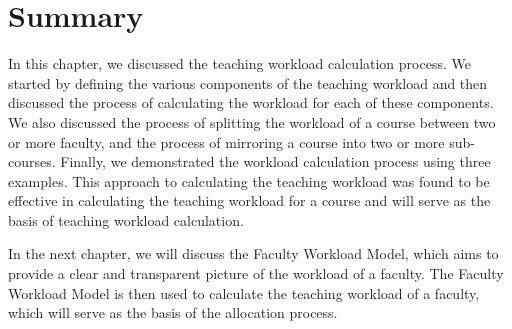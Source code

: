 \section{Summary}

In this chapter, we discussed the teaching workload calculation process. We started by defining the various components of the teaching workload and then discussed the process of calculating the workload for each of these components. We also discussed the process of splitting the workload of a course between two or more faculty, and the process of mirroring a course into two or more sub-courses. Finally, we demonstrated the workload calculation process using three examples. This approach to calculating the teaching workload was found to be effective in calculating the teaching workload for a course and will serve as the basis of teaching workload calculation.

In the next chapter, we will discuss the Faculty Workload Model, which aims to provide a clear and transparent picture of the workload of a faculty. The Faculty Workload Model is then used to calculate the teaching workload of a faculty, which will serve as the basis of the allocation process.

